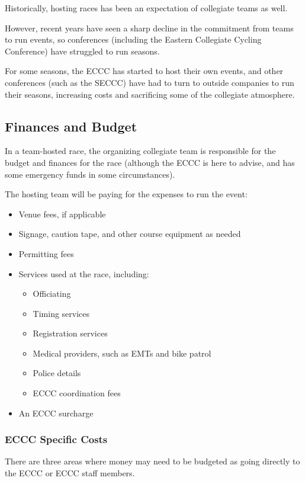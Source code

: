 \documentclass[
  letterpaper, %
  fontsize=10pt, %
  twoside=true,
  chapterentrydots=true, %
  numbers=noenddot,
  fontmethod=tex,
]{kaobook}
\begin{document}
Historically, hosting races has been an expectation of collegiate teams as well.

However, recent years have seen a sharp decline in the commitment from teams to run events,
so conferences (including the Eastern Collegiate Cycling Conference) have struggled to run seasons.

For some seasons, the ECCC has started to host their own events, %
and other conferences (such as the SECCC) have had to turn to outside companies to run their seasons, %
increasing costs and sacrificing some of the collegiate atmosphere.

\subsection{Finances and Budget}

In a team-hosted race, the organizing collegiate team is responsible for the budget and finances for the race (although the ECCC is here to advise, and has some emergency funds in some circumstances).

The hosting team will be paying for the expenses to run the event:
\begin{itemize}
  \item Venue fees, if applicable
  \item Signage, caution tape, and other course equipment as needed
  \item Permitting fees
  \item Services used at the race, including:
  \begin{itemize}
      \item Officiating
      \item Timing services
      \item Registration services
      \item Medical providers, such as EMTs and bike patrol
      \item Police details
      \item ECCC coordination fees
  \end{itemize}
  \item An ECCC surcharge
\end{itemize}

\subsubsection{ECCC Specific Costs}

There are three areas where money may need to be budgeted as going directly to the ECCC or ECCC staff members.
\end{document}
